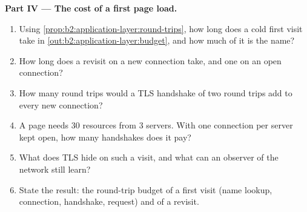 \begin{problem}
\medskip\noindent\textbf{Part IV --- The cost of a first page load.}\par\nopagebreak
\begin{enumerate}[resume, beginpenalty=10000]
\item Using \cref{prop:b2:application-layer:round-trips}, how long does a cold first visit take in
\cref{out:b2:application-layer:budget}, and how much of it is the name?
\item How long does a revisit on a new connection take, and one on an open connection?
\item How many round trips would a TLS handshake of two round trips add to every new connection?
\item A page needs 30 resources from 3 servers. With one connection per server kept open, how many handshakes does it
pay?
\item What does TLS hide on such a visit, and what can an observer of the network still learn?
\item State the result: the round-trip budget of a first visit (name lookup, connection, handshake, request) and of a
revisit.
\end{enumerate}
\end{problem}
